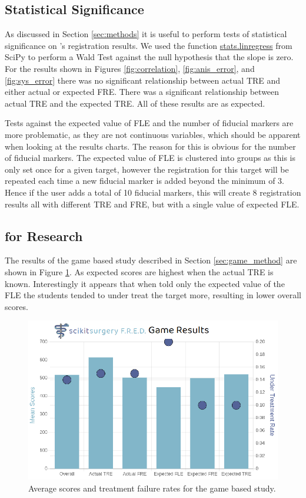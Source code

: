 \subsection{Statistical Significance}
As discussed in Section \ref{sec:methods} it is useful to perform tests of 
statistical significance on \fredns's registration results. 
We used the function \href{https://docs.scipy.org/doc/scipy/reference/generated/scipy.stats.linregress.html}{stats.linregress} from {SciPy}\cite{2020SciPy-NMeth} to
perform a Wald Test against the null hypothesis that the slope is zero. For the
results shown in Figures \ref{fig:correlation}, \ref{fig:anis_error}, 
and \ref{fig:sys_error} there was no significant
relationship between actual \gls{TRE} and either actual or expected \gls{FRE}. There was
a significant relationship between actual \gls{TRE} and the expected \gls{TRE}. All
of these results are as expected.

Tests against the expected value of \gls{FLE} and the number of fiducial markers are
more problematic, as they are not continuous variables, which should be apparent 
when looking at the results charts. The reason for this is obvious for the number
of fiducial markers. The expected value of \gls{FLE} is clustered into groups as this
is only set once for a given target, however the registration for this target 
will be repeated each time a new fiducial marker is added beyond the minimum of 3. Hence 
if the user adds a total of 10 fiducial markers, this will create 8 registration 
results all with different \gls{TRE} and \gls{FRE}, but with a single value of 
expected \gls{FLE}.


\subsection{\fred for Research}
The results of the game based study described in Section \ref{sec:game_method}
are shown in 
Figure \ref{fig:usability}. As expected scores are 
highest when the actual \gls{TRE} is known. Interestingly it appears that when told only the expected value of the \gls{FLE} the students
tended to under treat the target more, resulting in lower overall scores. 


\begin{figure}
        \begin{center}
        \includegraphics[width=0.5\linewidth]{usability.eps}
                \caption{\label{fig:usability}Average scores and treatment failure rates for the game based study.}
	\end{center}
\end{figure}

